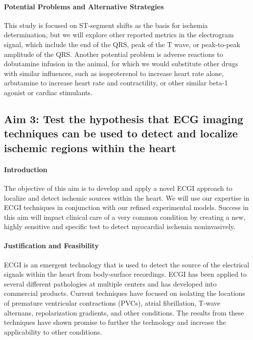\paragraph{Potential Problems and Alternative Strategies} This study is
focused on ST-segment shifts as the basis for ischemia determination, but
we will explore other reported metrics in the electrogram signal, which
include the end of the QRS, peak of the T wave, or peak-to-peak amplitude
of the QRS. Another potential problem is adverse reactions to dobutamine
infusion in the animal, for which we would substitute other drugs with
similar influences, such as isoproterenol to increase heart rate alone,
arbutamine to increase heart rate and contractility, or other similar
beta-1 agonist or cardiac stimulants.

\subsection{Aim 3: Test the hypothesis that ECG imaging techniques can be used to detect and localize ischemic regions within the heart}

 \paragraph{Introduction} The objective of this aim is to develop and apply a novel ECGI approach to
localize and detect ischemic sources within the heart. We will use our
expertise in ECGI techniques in conjunction with our refined experimental
models. Success in this aim will impact clinical care of a very common
condition by creating a new, highly sensitive and specific test to detect
myocardial ischemia noninvasively.

\paragraph{Justification and Feasibility}
 ECGI is an emergent technology that
 is used to detect the source of the electrical signals within the heart
 from body-surface recordings.
ECGI has been applied to several different pathologies at multiple centers
and has developed into commercial products. Current techniques have focused
on isolating the locations of premature ventricular contractions (PVCs), atrial
fibrillation, T-wave alternans, repolarization gradients, and other
conditions.\cite{BLZ:Pot2014,BLZ:Dub2015,BLZ:Wan2016a,RSM:Sha2015,BLZ:Wan2018}
The results from these techniques have shown promise to further the
technology and increase the applicability to other conditions.

